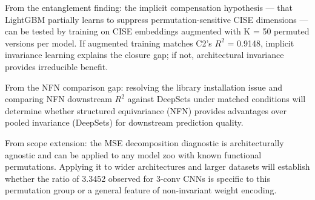 From the entanglement finding: the implicit compensation hypothesis --- that LightGBM partially learns to suppress permutation-sensitive CISE dimensions --- can be tested by training on CISE embeddings augmented with K = 50 permuted versions per model. If augmented training matches C2's $R^2$ = 0.9148, implicit invariance learning explains the closure gap; if not, architectural invariance provides irreducible benefit.

From the NFN comparison gap: resolving the library installation issue and comparing NFN downstream $R^2$ against DeepSets under matched conditions will determine whether structured equivariance (NFN) provides advantages over pooled invariance (DeepSets) for downstream prediction quality.

From scope extension: the MSE decomposition diagnostic is architecturally agnostic and can be applied to any model zoo with known functional permutations. Applying it to wider architectures and larger datasets will establish whether the ratio of 3.3452 observed for 3-conv CNNs is specific to this permutation group or a general feature of non-invariant weight encoding.

